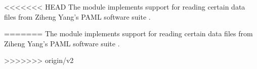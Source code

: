 <<<<<<< HEAD
The  module implements support for reading certain data
files from Ziheng Yang's PAML software suite \citep{Yang97}.


=======
The  module implements support for reading certain data
files from Ziheng Yang's PAML software suite \citep{Yang97}.


>>>>>>> origin/v2
